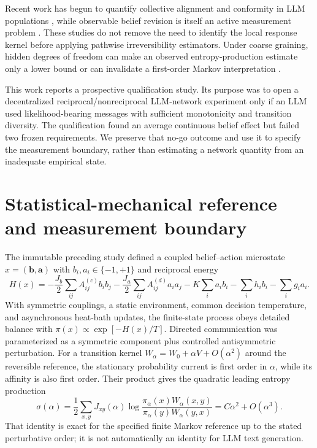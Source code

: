 \documentclass[12pt]{article}
\begin{document}
Recent work has begun to quantify collective alignment and conformity in LLM
populations \cite{han2026,denobili2026,okawa2026}, while observable belief
revision is itself an active measurement problem \cite{farmer2026}.  These
studies do not remove the need to identify the local response kernel before
applying pathwise irreversibility estimators.  Under coarse graining, hidden
degrees of freedom can make an observed entropy-production estimate only a
lower bound or can invalidate a first-order Markov interpretation
\cite{kawaguchi2013,roldan2012,skinner2021}.

This work reports a prospective qualification study.  Its purpose was to open
a decentralized reciprocal/nonreciprocal LLM-network experiment only if an
LLM used likelihood-bearing messages with sufficient monotonicity and
transition diversity.  The qualification found an average continuous belief
effect but failed two frozen requirements.  We preserve that no-go outcome and
use it to specify the measurement boundary, rather than estimating a network
quantity from an inadequate empirical state.

\section{Statistical-mechanical reference and measurement boundary}

The immutable preceding study defined a coupled belief--action microstate
$x=(\mathbf b,\mathbf a)$ with $b_i,a_i\in\{-1,+1\}$ and reciprocal energy
\begin{equation}
 H(x)=-\frac{J_b}{2}\sum_{ij}A^{(c)}_{ij}b_i b_j
      -\frac{J_a}{2}\sum_{ij}A^{(d)}_{ij}a_i a_j
      -K\sum_i a_i b_i-\sum_i h_i b_i-\sum_i g_i a_i .
 \label{eq:hamiltonian}
\end{equation}
With symmetric couplings, a static environment, common decision temperature,
and asynchronous heat-bath updates, the finite-state process obeys detailed
balance with $\pi(x)\propto\exp[-H(x)/T]$.  Directed communication was
parameterized as a symmetric component plus controlled antisymmetric
perturbation.  For a transition kernel
$W_\alpha=W_0+\alpha V+O(\alpha^2)$ around the reversible reference, the
stationary probability current is first order in $\alpha$, while its affinity
is also first order.  Their product gives the quadratic leading entropy
production
\begin{equation}
 \sigma(\alpha)=\frac12\sum_{x,y}J_{xy}(\alpha)
 \log\frac{\pi_\alpha(x)W_\alpha(x,y)}
               {\pi_\alpha(y)W_\alpha(y,x)}
 =C\alpha^2+O(\alpha^3).
 \label{eq:epr}
\end{equation}
That identity is exact for the specified finite Markov reference up to the
stated perturbative order; it is not automatically an identity for LLM text
generation.
\end{document}
